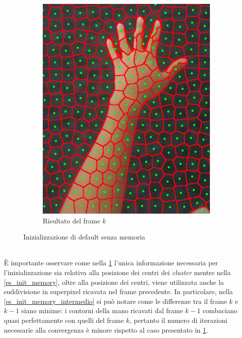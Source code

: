\documentclass[12pt,a4paper,oneside]{article}
\begin{document}
\begin{figure}[!htb]
\begin{subfigure}[t]{.325\textwidth}
		\includegraphics[width=\textwidth]{resources/images/risultatoFrameAttuale_no_memory.png}
		\captionsetup{justification=centering}
		\caption{Risultato del frame $k$}
	\end{subfigure}%
	\caption{Inizializzazione di default senza memoria}\label{es_init_no_memory}
\end{figure}
\\È importante osservare come nella \cref{es_init_no_memory} l'unica informazione necessaria per l'inizializzazione sia relativa alla posizione dei centri dei \textit{cluster} mentre nella \cref{es_init_memory}, oltre alla posizione dei centri, viene utilizzata anche la suddivisione in superpixel ricavata nel frame precedente. In particolare, nella \cref{es_init_memory_intermedio} si può notare come le differenze tra il frame $k$ e \mbox{$k - 1$} siano minime: i contorni della mano ricavati dal frame \mbox{$k - 1$} combaciano quasi perfettamente con quelli del frame $k$, pertanto il numero di iterazioni necessarie alla convergenza è minore rispetto al caso presentato in \cref{es_init_no_memory}.
\end{document}

